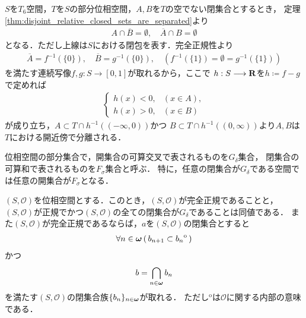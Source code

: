 	\begin{prf}
		$S$を$T_6$空間，$T$を$S$の部分位相空間，$A,B$を$T$の空でない閉集合とするとき，
		定理\ref{thm:disjoint_relative_closed_sets_are_separated}より
		\begin{align}
			A \cap \overline{B} = \emptyset,\quad \overline{A} \cap B = \emptyset
		\end{align}
		となる．ただし上線は$S$における閉包を表す．完全正規性より
		\begin{align}
			\overline{A} = f^{-1}(\{0\}),
			\quad \overline{B} = g^{-1}(\{0\}),
			\quad \left( f^{-1}(\{1\}) = \emptyset = g^{-1}(\{1\}) \right)
		\end{align}
		を満たす連続写像$f,g:S \longrightarrow [0,1]$が取れるから，ここで
		$h:S \longrightarrow \mathbf{R}$を$h \coloneqq f - g$で定めれば
		\begin{align}
			\begin{cases}
				h(x) < 0, & (x \in A), \\
				h(x) > 0, & (x \in B)
			\end{cases}
		\end{align}
		が成り立ち，$A \subset T \cap h^{-1}((-\infty,0))$かつ
		$B \subset T \cap h^{-1}((0,\infty))$より$A,B$は$T$における開近傍で分離される．
		\QED
	\end{prf}
	
	\begin{screen}
		\begin{dfn}
			位相空間の部分集合で，開集合の可算交叉で表されるものを$G_\delta$集合，
			閉集合の可算和で表されるものを$F_\sigma$集合と呼ぶ．
			特に，任意の閉集合が$G_\delta$である空間では任意の開集合が$F_\sigma$となる．
		\end{dfn}
	\end{screen}
	
	\begin{screen}
		\begin{thm}
		\label{thm:perfectly_normal_Hausdorff_is_normal_and_closed_is_G_delta}
			$(S,\mathscr{O})$を位相空間とする．このとき，$(S,\mathscr{O})$が完全正規であることと，
			$(S,\mathscr{O})$が正規でかつ$(S,\mathscr{O})$の全ての閉集合が$G_\delta$であることは同値である．
			また$(S,\mathscr{O})$が完全正規であるならば，$a$を$(S,\mathscr{O})$の閉集合とすると
			\begin{align}
				\forall n \in {\boldsymbol \omega}\, (\, b_{n+1} \subset {b_n}^{\mathrm{o}}\, )
			\end{align}
			かつ
			\begin{align}
				b = \bigcap_{n \in {\boldsymbol \omega}} b_n
			\end{align}
			を満たす$(S,\mathscr{O})$の閉集合族$\{b_n\}_{n \in {\boldsymbol \omega}}$が取れる．
			ただし${}^\mathrm{o}$は$\mathscr{O}$に関する内部の意味である．
		\end{thm}
	\end{screen}
	
